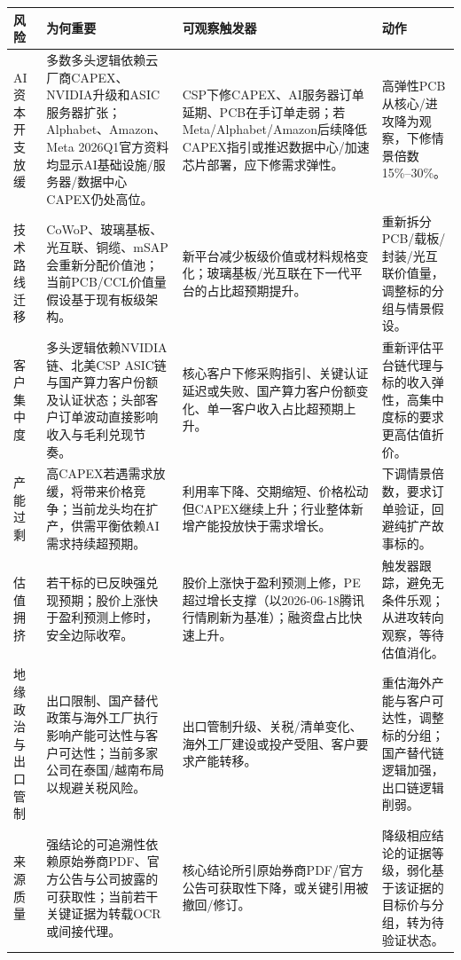 \begin{exhibitbox}[图表11-2：会改变观点的触发条件]
\footnotesize
\begin{tabularx}{\textwidth}{L{2.2cm}X X X}
\toprule
\textbf{风险} & \textbf{为何重要} & \textbf{可观察触发器} & \textbf{动作} \\
\midrule
AI资本开支放缓 & 多数多头逻辑依赖云厂商CAPEX、NVIDIA升级和ASIC服务器扩张；Alphabet、Amazon、Meta 2026Q1官方资料均显示AI基础设施/服务器/数据中心CAPEX仍处高位。 & CSP下修CAPEX、AI服务器订单延期、PCB在手订单走弱；若Meta/Alphabet/Amazon后续降低CAPEX指引或推迟数据中心/加速芯片部署，应下修需求弹性。 & 高弹性PCB从核心/进攻降为观察，下修情景倍数15\%--30\%。 \\
技术路线迁移 & CoWoP、玻璃基板、光互联、铜缆、mSAP会重新分配价值池；当前PCB/CCL价值量假设基于现有板级架构。 & 新平台减少板级价值或材料规格变化；玻璃基板/光互联在下一代平台的占比超预期提升。 & 重新拆分PCB/载板/封装/光互联价值量，调整标的分组与情景假设。 \\
客户集中度 & 多头逻辑依赖NVIDIA链、北美CSP ASIC链与国产算力客户份额及认证状态；头部客户订单波动直接影响收入与毛利兑现节奏。 & 核心客户下修采购指引、关键认证延迟或失败、国产算力客户份额变化、单一客户收入占比超预期上升。 & 重新评估平台链代理与标的收入弹性，高集中度标的要求更高估值折价。 \\
产能过剩 & 高CAPEX若遇需求放缓，将带来价格竞争；当前龙头均在扩产，供需平衡依赖AI需求持续超预期。 & 利用率下降、交期缩短、价格松动但CAPEX继续上升；行业整体新增产能投放快于需求增长。 & 下调情景倍数，要求订单验证，回避纯扩产故事标的。 \\
估值拥挤 & 若干标的已反映强兑现预期；股价上涨快于盈利预测上修时，安全边际收窄。 & 股价上涨快于盈利预测上修，PE超过增长支撑（以2026-06-18腾讯行情刷新为基准）；融资盘占比快速上升。 & 触发器跟踪，避免无条件乐观；从进攻转向观察，等待估值消化。 \\
地缘政治与出口管制 & 出口限制、国产替代政策与海外工厂执行影响产能可达性与客户可达性；当前多家公司在泰国/越南布局以规避关税风险。 & 出口管制升级、关税/清单变化、海外工厂建设或投产受阻、客户要求产能转移。 & 重估海外产能与客户可达性，调整标的分组；国产替代链逻辑加强，出口链逻辑削弱。 \\
来源质量 & 强结论的可追溯性依赖原始券商PDF、官方公告与公司披露的可获取性；当前若干关键证据为转载OCR或间接代理。 & 核心结论所引原始券商PDF/官方公告可获取性下降，或关键引用被撤回/修订。 & 降级相应结论的证据等级，弱化基于该证据的目标价与分组，转为待验证状态。 \\
\bottomrule
\end{tabularx}
\end{exhibitbox}

